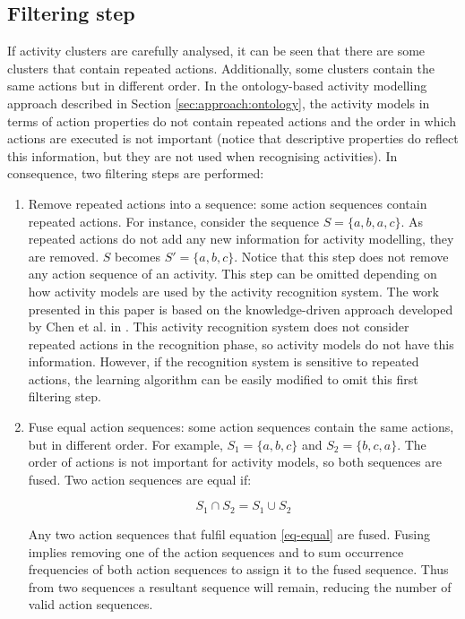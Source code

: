 \subsection{Filtering step}
\label{subsec:learner:filtering}

If activity clusters are carefully analysed, it can be seen that there are some clusters that contain repeated actions. Additionally, some clusters contain the same actions but in different order. In the ontology-based activity modelling approach described in Section \ref{sec:approach:ontology}, the activity models in terms of action properties do not contain repeated actions and the order in which actions are executed is not important (notice that descriptive properties do reflect this information, but they are not used when recognising activities). In consequence, two filtering steps are performed:

\begin{enumerate}
 \item Remove repeated actions into a sequence: some action sequences contain repeated actions. For instance, consider the sequence $S=\{a, b, a, c\}$. As repeated actions do not add any new information for activity modelling, they are removed. $S$ becomes $S' = \{a, b, c\}$. Notice that this step does not remove any action sequence of an activity. This step can be omitted depending on how activity models are used by the activity recognition system. The work presented in this paper is based on the knowledge-driven approach developed by Chen et al. in \cite{Chen2012a}. This activity recognition system does not consider repeated actions in the recognition phase, so activity models do not have this information. However, if the recognition system is sensitive to repeated actions, the learning algorithm can be easily modified to omit this first filtering step.
 
 \item Fuse equal action sequences: some action sequences contain the same actions, but in different order. For example, $S_1 = \{a, b, c \}$ and $S_2 = \{b, c, a\}$. The order of actions is not important for activity models, so both sequences are fused. Two action sequences are equal if:
 
 \begin{equation}
 \label{eq-equal}
  S_1 \cap S_2 = S_1 \cup S_2
 \end{equation}

 Any two action sequences that fulfil equation \ref{eq-equal} are fused. Fusing implies removing one of the action sequences and to sum occurrence frequencies of both action sequences to assign it to the fused sequence. Thus from two sequences a resultant sequence will remain, reducing the number of valid action sequences.

\end{enumerate}

